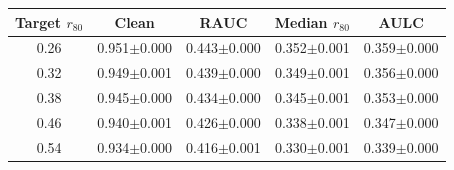 \begin{tabular}{ccccc}
\hline
Target $r_{80}$ & Clean & RAUC & Median $r_{80}$ & AULC \\
\hline
0.26 & 0.951$\pm$0.000 & 0.443$\pm$0.000 & 0.352$\pm$0.001 & 0.359$\pm$0.000 \\
0.32 & 0.949$\pm$0.001 & 0.439$\pm$0.000 & 0.349$\pm$0.001 & 0.356$\pm$0.000 \\
0.38 & 0.945$\pm$0.000 & 0.434$\pm$0.000 & 0.345$\pm$0.001 & 0.353$\pm$0.000 \\
0.46 & 0.940$\pm$0.001 & 0.426$\pm$0.000 & 0.338$\pm$0.001 & 0.347$\pm$0.000 \\
0.54 & 0.934$\pm$0.000 & 0.416$\pm$0.001 & 0.330$\pm$0.001 & 0.339$\pm$0.000 \\
\hline
\end{tabular}
